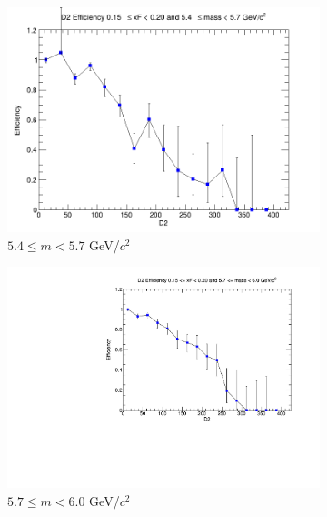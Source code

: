 \begin{figure}[p]
\begin{subfigure}[b]{0.32\textwidth}
        \centering
        \includegraphics[width=\textwidth]{./kTrackerEfficiencyPlots/D2_Efficiency_xF3_mass4.png}
        \caption{$5.4 \leq m < 5.7$ GeV/$c^2$}
        \label{fig:xF3_mass4}
    \end{subfigure}
    \hfill
    \begin{subfigure}[b]{0.32\textwidth}
        \centering
        \includegraphics[width=\textwidth]{./kTrackerEfficiencyPlots/D2_Efficiency_xF3_mass5.pdf}
        \caption{$5.7 \leq m < 6.0$ GeV/$c^2$}
        \label{fig:xF3_mass5}
    \end{subfigure}
    \vspace{0.5cm}
    \begin{subfigure}[b]{0.32\textwidth}
        \centering

\end{subfigure}
\end{figure}
